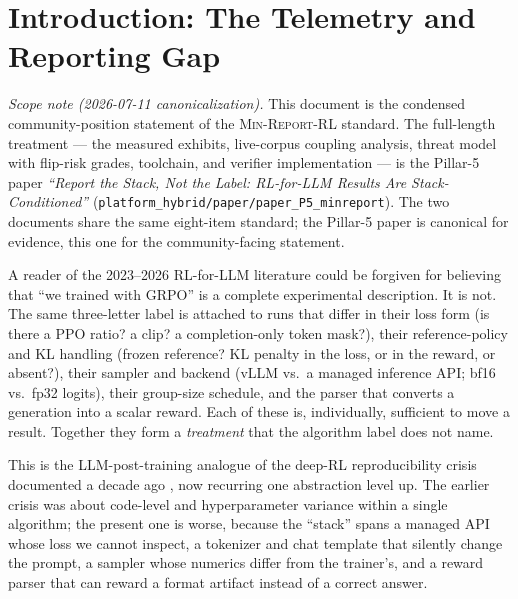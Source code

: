 \documentclass[11pt]{article}
\newcommand{\minreport}{\textsc{Min-Report-RL}}
\begin{document}
\section{Introduction: The Telemetry and Reporting Gap}
\label{sec:intro}


\noindent\emph{Scope note (2026-07-11 canonicalization).} This document is
the condensed community-position statement of the \minreport{} standard.
The full-length treatment --- the measured exhibits, live-corpus coupling
analysis, threat model with flip-risk grades, toolchain, and verifier
implementation --- is the Pillar-5 paper \emph{``Report the Stack, Not the
Label: RL-for-LLM Results Are Stack-Conditioned''}
(\texttt{platform\_hybrid/paper/paper\_P5\_minreport}). The two documents
share the same eight-item standard; the Pillar-5 paper is canonical for
evidence, this one for the community-facing statement.

A reader of the 2023--2026 RL-for-LLM literature could be forgiven for
believing that ``we trained with GRPO'' is a complete experimental
description. It is not. The same three-letter label is attached to runs that
differ in their loss form (is there a PPO ratio? a clip? a completion-only
token mask?), their reference-policy and KL handling (frozen reference? KL
penalty in the loss, or in the reward, or absent?), their sampler and backend
(vLLM vs.\ a managed inference API; bf16 vs.\ fp32 logits), their group-size
schedule, and the parser that converts a generation into a scalar reward. Each
of these is, individually, sufficient to move a result. Together they form a
\emph{treatment} that the algorithm label does not name.

This is the LLM-post-training analogue of the deep-RL reproducibility crisis
documented a decade ago \cite{henderson2018deep,islam2017reproducibility},
now recurring one abstraction level up. The earlier crisis was about code-level
and hyperparameter variance within a single algorithm; the present one is
worse, because the ``stack'' spans a managed API whose loss we cannot inspect,
a tokenizer and chat template that silently change the prompt, a sampler whose
numerics differ from the trainer's, and a reward parser that can reward a
format artifact instead of a correct answer.
\end{document}
